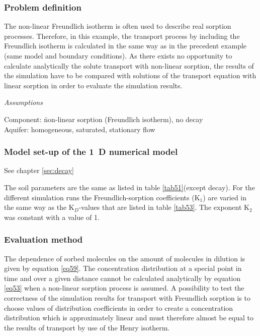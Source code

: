 \subsubsection*{Problem definition}

The non-linear Freundlich isotherm is often used to describe real sorption processes. Therefore, in this example, the transport process by including the Freundlich isotherm is calculated in the same way as in the precedent example (same model and boundary conditions). As there exists no opportunity to calculate analytically the solute transport with non-linear sorption, the results of the simulation have to be compared with solutions of the transport equation with linear sorption in order to evaluate the simulation results.

\textsl{Assumptions}

\begin{tabbing}
Component: \= non-linear sorption (Freundlich isotherm), no decay \\
Aquifer: \> homogeneous, saturated, stationary flow \\
\end{tabbing}

\subsubsection*{Model set-up of the 1~D numerical model}

See chapter \ref{sec:decay}

The soil parameters are the same as listed in table \ref{tab51}(except decay). For the different simulation runs the Freundlich-sorption coefficients (K$_1$) are varied in the same way as the K$_D$-values that are listed in table \ref{tab53}. The exponent K$_2$ was constant with a value of 1.

\subsubsection*{Evaluation method}
The dependence of sorbed molecules on the amount of molecules in dilution is given by equation \ref{eq59}. The concentration distribution at a special point in time and over a given distance cannot be calculated analytically by equation \ref{eq53} when a non-linear sorption process is assumed. A possibility to test the correctness of the simulation results for transport with Freundlich sorption is to choose values of distribution coefficients in order to create a concentration distribution which is approximately linear and must therefore almost be equal to the results of transport by use of the Henry isotherm.

